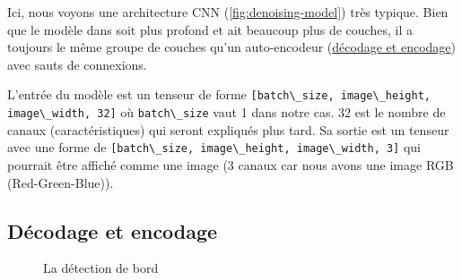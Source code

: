 \documentclass[
  11pt,
  dvipsnames]{article}
\newcommand{\passthrough}[1]{#1}
\begin{document}
Ici, nous voyons une architecture CNN (\ref{fig:denoising-model}) très typique. Bien que le modèle dans \autocite{1711.10925} soit plus profond et ait beaucoup plus de couches, il a toujours le même groupe de couches qu'un auto-encodeur (\protect\hyperlink{duxe9codage-et-encodage}{décodage et encodage}) avec sauts de connexions.

L'entrée du modèle est un tenseur de forme \passthrough{\lstinline![batch\_size, image\_height, image\_width, 32]!} où \passthrough{\lstinline!batch\_size!} vaut 1 dans notre cas. 32 est le nombre de canaux (caractéristiques) qui seront expliqués plus tard. Sa sortie est un tenseur avec une forme de \passthrough{\lstinline![batch\_size, image\_height, image\_width, 3]!} qui pourrait être affiché comme une image (3 canaux car nous avons une image RGB (Red-Green-Blue)).

\hypertarget{duxe9codage-et-encodage}{%
\subsection{Décodage et encodage}\label{duxe9codage-et-encodage}}

\begin{figure}

{\centering {}

}

\caption{La détection de bord}\label{fig:compare-with-edge}
\end{figure}
\end{document}
